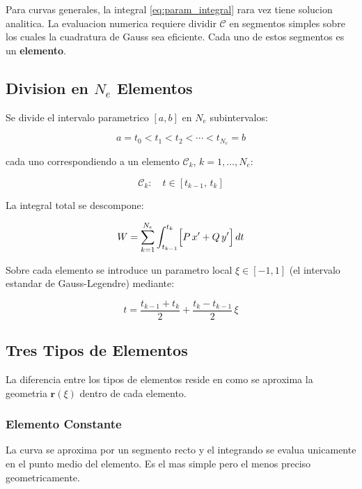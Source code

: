 \documentclass[12pt,a4paper]{article}
\begin{document}
Para curvas generales, la integral \eqref{eq:param_integral} rara vez
tiene solucion analitica. La evaluacion numerica requiere dividir
$\mathcal{C}$ en segmentos simples sobre los cuales la cuadratura de
Gauss sea eficiente. Cada uno de estos segmentos es un \textbf{elemento}.

\subsection{Division en $N_e$ Elementos}

Se divide el intervalo parametrico $[a,b]$ en $N_e$ subintervalos:

\begin{equation}
    a = t_0 < t_1 < t_2 < \cdots < t_{N_e} = b
\end{equation}

cada uno correspondiendo a un elemento $\mathcal{C}_k$, $k=1,\ldots,N_e$:

\begin{equation}
    \mathcal{C}_k: \quad t \in [t_{k-1},\, t_k]
\end{equation}

La integral total se descompone:

\begin{equation}
    W = \sum_{k=1}^{N_e} \int_{t_{k-1}}^{t_k}
    \Bigl[ P\,x' + Q\,y' \Bigr]\, dt
\end{equation}

Sobre cada elemento se introduce un parametro local $\xi \in [-1,1]$
(el intervalo estandar de Gauss-Legendre) mediante:

\begin{equation}
    t = \frac{t_{k-1}+t_k}{2} + \frac{t_k - t_{k-1}}{2}\,\xi
\end{equation}

\subsection{Tres Tipos de Elementos}

La diferencia entre los tipos de elementos reside en como se aproxima la
geometria $\mathbf{r}(\xi)$ dentro de cada elemento.

\subsubsection{Elemento Constante}

La curva se aproxima por un segmento recto y el integrando se evalua
unicamente en el punto medio del elemento. Es el mas simple pero el menos
preciso geometricamente.
\end{document}
